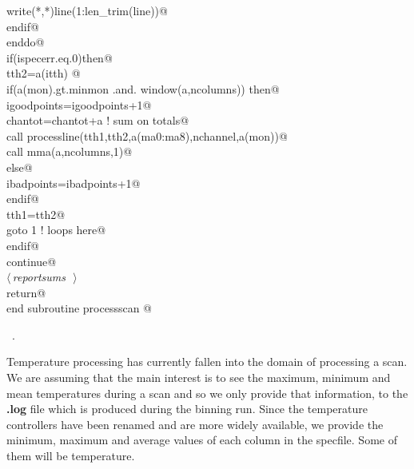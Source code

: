\documentclass[10pt,a4paper,notitlepage]{article}
\newcommand{\code}[1]{\textbf{\textsf{#1}}} %
\begin{document}
\begin{flushleft}
\begin{list}{}{}
\mbox{}\verb@         write(*,*)line(1:len_trim(line))@\\
\mbox{}\verb@        endif@\\
\mbox{}\verb@      enddo@\\
\mbox{}\verb@      if(ispecerr.eq.0)then@\\
\mbox{}\verb@        tth2=a(itth)  @\\
\mbox{}\verb@        if(a(mon).gt.minmon .and. window(a,ncolumns)) then@\\
\mbox{}\verb@         igoodpoints=igoodpoints+1@\\
\mbox{}\verb@         chantot=chantot+a ! sum on totals@\\
\mbox{}\verb@         call processline(tth1,tth2,a(ma0:ma8),nchannel,a(mon))@\\
\mbox{}\verb@         call mma(a,ncolumns,1)@\\
\mbox{}\verb@        else@\\
\mbox{}\verb@         ibadpoints=ibadpoints+1@\\
\mbox{}\verb@        endif@\\
\mbox{}\verb@        tth1=tth2@\\
\mbox{}\verb@        goto 1            ! loops here@\\
\mbox{}\verb@      endif@\\
\mbox{}     continue@\\
\mbox{}\verb@@\hbox{$\langle\,${\it reportsums}\nobreak\ {\footnotesize {}}$\,\rangle$}\verb@@\\
\mbox{}\verb@      return@\\
\mbox{}\verb@      end subroutine processscan                                             @{\NWsep}
\end{list}
\vspace{-1.5ex}
\footnotesize
\begin{list}{}{\setlength{\itemsep}{-\parsep}\setlength{\itemindent}{-\leftmargin}}
\item \NWtxtMacroRefIn\ .

\item{}
\end{list}
\vspace{4ex}
\end{flushleft}
Temperature processing has currently fallen into the domain of processing a 
scan. 
We are assuming that the main interest is to see the maximum, minimum and
mean temperatures during a scan and so we only provide that information,
to the \code{.log} file which is produced during the binning run.
Since the temperature controllers have been renamed and are more widely 
available, we provide the minimum, maximum and average values of
each column in the specfile. Some of them will be temperature.
\end{document}
